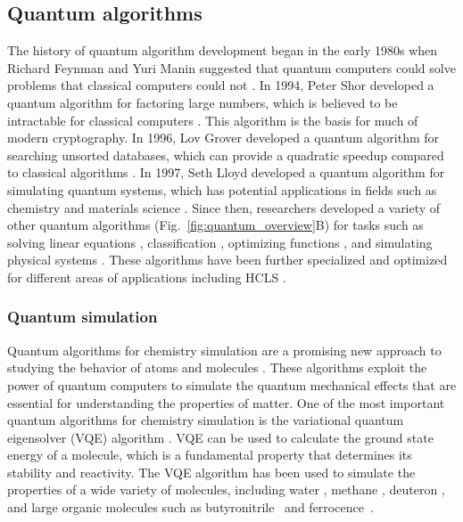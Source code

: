 \documentclass{article}
\begin{document}
\subsection{Quantum algorithms}
The history of quantum algorithm development began in the early 1980s when Richard Feynman and Yuri Manin suggested that quantum computers could solve problems that classical computers could not \cite{feynman1985quantum,Manin2023-fz}. In 1994, Peter Shor developed a quantum algorithm for factoring large numbers, which is believed to be intractable for classical computers \cite{shor1994algorithms}. This algorithm is the basis for much of modern cryptography. In 1996, Lov Grover developed a quantum algorithm for searching unsorted databases, which can provide a quadratic speedup compared to classical algorithms \cite{grover1996fast}. In 1997, Seth Lloyd developed a quantum algorithm for simulating quantum systems, which has potential applications in fields such as chemistry and materials science \cite{lloyd1996universal}.
Since then, researchers developed a variety of other quantum algorithms (Fig.~\ref{fig:quantum_overview}B) for tasks such as solving linear equations \cite{lloyd2010quantum}, classification \cite{havlivcek2019supervised},  optimizing functions \cite{farhi2014quantum}, and simulating physical systems \cite{peruzzo2014variational, motta2022emerging}. These algorithms have been further specialized and optimized for different areas of applications including HCLS \cite{cao2018potential, krunic2022quantum}.
\\

\subsubsection{Quantum simulation} 
Quantum algorithms for chemistry simulation are a promising new approach to studying the behavior of atoms and molecules \cite{mcardle2020quantum}. These algorithms exploit the power of quantum computers to simulate the quantum mechanical effects that are essential for understanding the properties of matter. One of the most important quantum algorithms for chemistry simulation is the variational quantum eigensolver (VQE) algorithm \cite{peruzzo2014variational}. VQE can be used to calculate the ground state energy of a molecule, which is a fundamental property that determines its stability and reactivity. The VQE algorithm has been used to simulate the properties of a wide variety of molecules, including water \cite{nam2020ground}, methane \cite{gokhale2020optimization}, deuteron \cite{dumitrescu2018cloud, shehab2019toward}, and large organic molecules such as butyronitrile~\cite{Rossmannek2023} and ferrocence~\cite{fitzpatrick2022selfconsistent}.
\end{document}
